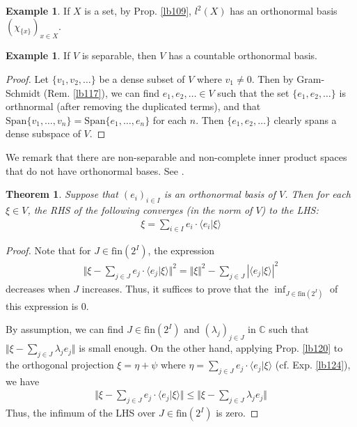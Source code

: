 \documentclass[12pt,b5paper,notitlepage]{article}
\theoremstyle{definition}
\newtheorem{eg}[df]{Example}
\theoremstyle{plain}
\newtheorem{thm}[df]{Theorem}
\newcommand{\Span}{\mathrm{Span}}
\newcommand{\bk}[1]{\langle {#1}\rangle}
\newcommand{\Cbb}{\mathbb C}
\newcommand{\fin}{\mathrm{fin}}
\numberwithin{equation}{section}
\begin{document}
\begin{eg}
If $X$ is a set, by Prop. \ref{lb109}, $l^2(X)$ has an orthonormal basis $(\chi_{\{x\}})_{x\in X}$.
\end{eg}


\begin{eg}\label{lb122}
If $V$ is separable, then $V$ has a countable orthonormal basis.
\end{eg}

\begin{proof}
Let $\{v_1,v_2,\dots\}$ be a dense subset of $V$ where $v_1\neq 0$. Then by Gram-Schmidt (Rem. \ref{lb117}), we can find $e_1,e_2,\dots\in V$ such that the set $\{e_1,e_2,\dots\}$ is orthnormal (after removing the duplicated terms), and that $\Span\{v_1,\dots,v_n\}=\Span\{e_1,\dots,e_n\}$ for each $n$. Then $\{e_1,e_2,\dots\}$ clearly spans a dense subspace of $V$.
\end{proof}

We remark that there are non-separable and non-complete inner product spaces that do not have orthonormal bases. See \cite{Gud74}.


\begin{thm}\label{lb123}
Suppose that $(e_i)_{i\in I}$ is an orthonormal basis of $V$. Then for each $\xi\in V$, the RHS of the following converges (in the norm of $V$) to the LHS:
\begin{align}
\xi=\sum_{i\in I}e_i\cdot\bk{e_i|\xi}
\end{align}
\end{thm}

\begin{proof}
Note that for $J\in\fin(2^I)$, the expression
\begin{align*}
\Big\Vert \xi-\sum_{j\in J}e_j\cdot\bk{e_j|\xi}\Big\Vert^2=\Vert \xi\Vert^2-\sum_{j\in J}|\bk{e_j|\xi}|^2
\end{align*}
decreases when $J$ increases. Thus, it suffices to prove that the $\inf_{J\in \fin(2^I)}$ of this expression is $0$. 

By assumption,  we can find $J\in\fin(2^I)$ and $(\lambda_j)_{j\in J}$ in $\Cbb$ such that $\Vert \xi-\sum_{j\in J}\lambda_je_j\Vert$ is small enough. On the other hand, applying Prop. \ref{lb120} to the orthogonal projection $\xi=\eta+\psi$ where $\eta=\sum_{j\in J}e_j\cdot\bk{e_j|\xi}$ (cf. Exp. \ref{lb124}), we have
\begin{align}
\Big\Vert \xi-\sum_{j\in J}e_j\cdot\bk{e_j|\xi}\Big\Vert\leq \Big\Vert \xi-\sum_{j\in J}\lambda_je_j\Big\Vert
\end{align}
Thus, the infimum of the LHS over $J\in\fin(2^I)$ is zero.
\end{proof}
\end{document}
